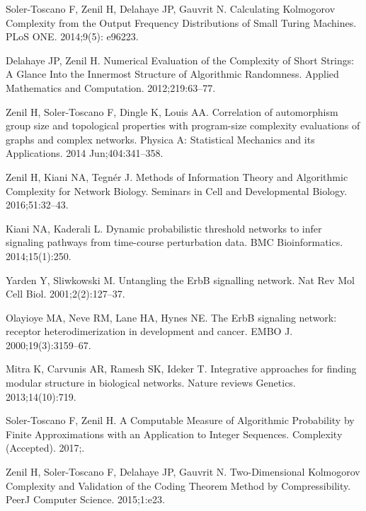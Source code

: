 \documentclass[10pt]{article}
\begin{document}
\begin{thebibliography}{10}
Soler-Toscano F, Zenil H, Delahaye JP, Gauvrit N.
\newblock Calculating Kolmogorov Complexity from the Output Frequency
  Distributions of Small Turing Machines.
\newblock PLoS ONE. 2014;9(5): e96223.

Delahaye JP, Zenil H.
\newblock Numerical Evaluation of the Complexity of Short Strings: A Glance
  Into the Innermost Structure of Algorithmic Randomness.
\newblock Applied Mathematics and Computation. 2012;219:63--77.

Zenil H, Soler-Toscano F, Dingle K, Louis AA.
\newblock Correlation of automorphism group size and topological properties
  with program-size complexity evaluations of graphs and complex networks.
\newblock Physica A: Statistical Mechanics and its Applications. 2014
  Jun;404:341--358.

Zenil H, Kiani NA, Tegn{\'e}r J.
\newblock Methods of Information Theory and Algorithmic Complexity for Network
  Biology.
\newblock Seminars in Cell and Developmental Biology. 2016;51:32--43.

Kiani NA, Kaderali L.
\newblock Dynamic probabilistic threshold networks to infer signaling pathways
  from time-course perturbation data.
\newblock BMC Bioinformatics. 2014;15(1):250.

Yarden Y, Sliwkowski M.
\newblock Untangling the {E}rb{B} signalling network.
\newblock Nat Rev Mol Cell Biol. 2001;2(2):127--37.

Olayioye MA, Neve RM, Lane HA, Hynes NE.
\newblock The {E}rb{B} signaling network: receptor heterodimerization in
  development and cancer.
\newblock EMBO J. 2000;19(3):3159--67.

Mitra K, Carvunis AR, Ramesh SK, Ideker T.
\newblock Integrative approaches for finding modular structure in biological
  networks.
\newblock Nature reviews Genetics. 2013;14(10):719.

Soler-Toscano F, Zenil H.
\newblock A Computable Measure of Algorithmic Probability by Finite
  Approximations with an Application to Integer Sequences.
\newblock Complexity (Accepted). 2017;.

Zenil H, Soler-Toscano F, Delahaye JP, Gauvrit N.
\newblock Two-Dimensional {K}olmogorov Complexity and Validation of the Coding
  Theorem Method by Compressibility.
\newblock PeerJ Computer Science. 2015;1:e23.

\end{thebibliography}
\end{document}

